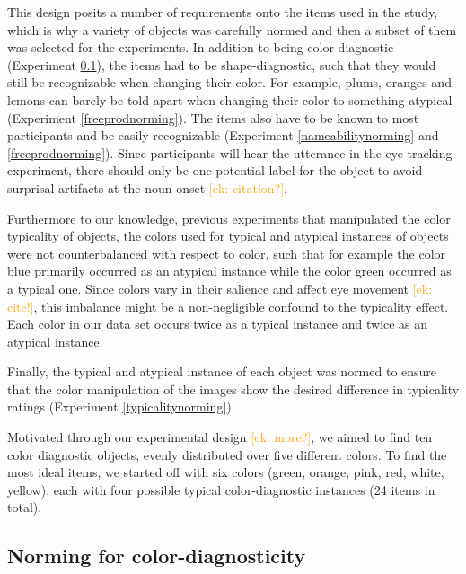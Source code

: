 \documentclass[a4paper,man,floatsintext,natbib,donotrepeattitle]{apa6}
\newcommand{\ek}[1]{\textcolor{Orange}{[ek: #1]}}
\begin{document}
This design posits a number of requirements onto the items used in the study, which is why a variety of objects was carefully normed and then a subset of them was selected for the experiments. In addition to being color-diagnostic (Experiment \ref{coldiagnorming}), the items had to be shape-diagnostic, such that they would still be recognizable when changing their color. For example, plums, oranges and lemons can barely be told apart when changing their color to something atypical (Experiment \ref{freeprodnorming}). The items also have to be known to most participants and be easily recognizable (Experiment \ref{nameabilitynorming} and \ref{freeprodnorming}). Since participants will hear the utterance in the eye-tracking experiment, there should only be one potential label for the object to avoid surprisal artifacts at the noun onset \ek{citation?}. 

Furthermore to our knowledge, previous experiments that manipulated the color typicality of objects, the colors used for typical and atypical instances of objects were not counterbalanced with respect to color, such that for example the color blue primarily occurred as an atypical instance while the color green occurred as a typical one. Since colors vary in their salience and affect eye movement \ek{cite!}, this imbalance might be a non-negligible confound to the typicality effect. Each color in our data set occurs twice as a typical instance and twice as an atypical instance.

Finally, the typical and atypical instance of each object was normed to ensure that the color manipulation of the images show the desired difference in typicality ratings (Experiment \ref{typicalitynorming}).

Motivated through our experimental design \ek{more?}, we aimed to find ten color diagnostic objects, evenly distributed over five different colors. To find the most ideal items, we started off with six colors (green, orange, pink, red, white, yellow), each with four possible typical color-diagnostic instances (24 items in total).

\subsection{Norming for color-diagnosticity}
\label{coldiagnorming}

\end{document}
